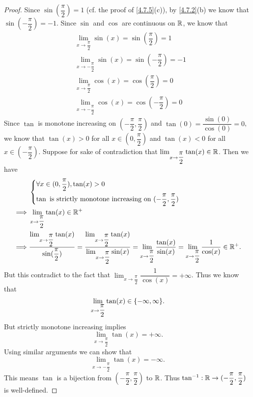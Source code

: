 \begin{proof}
  Since \(\sin(\dfrac{\pi}{2}) = 1\) (cf. the proof of \cref{4.7.5}(c)), by \cref{4.7.2}(b) we know that \(\sin(-\dfrac{\pi}{2}) = -1\).
  Since \(\sin\) and \(\cos\) are continuous on \(\mathbb{R}\), we know that
  \begin{align*}
     & \lim_{x \to \dfrac{\pi}{2}} \sin(x) = \sin(\dfrac{\pi}{2}) = 1    \\
     & \lim_{x \to -\dfrac{\pi}{2}} \sin(x) = \sin(-\dfrac{\pi}{2}) = -1 \\
     & \lim_{x \to \dfrac{\pi}{2}} \cos(x) = \cos(\dfrac{\pi}{2}) = 0    \\
     & \lim_{x \to -\dfrac{\pi}{2}} \cos(x) = \cos(-\dfrac{\pi}{2}) = 0
  \end{align*}
  Since \(\tan\) is monotone increasing on \((-\dfrac{\pi}{2}, \dfrac{\pi}{2})\) and \(\tan(0) = \dfrac{\sin(0)}{\cos(0)} = 0\), we know that \(\tan(x) > 0\) for all \(x \in (0, \dfrac{\pi}{2})\) and \(\tan(x) < 0\) for all \(x \in (-\dfrac{\pi}{2})\).
  Suppose for sake of contradiction that \(\lim_{x \to \dfrac{\pi}{2}} \tan(x) \in \mathbb{R}\).
  Then we have
  \begin{align*}
             & \begin{dcases}
                 \forall x \in (0, \dfrac{\pi}{2}), \tan(x) > 0 \\
                 \tan \text{ is strictly monotone increasing on } (-\dfrac{\pi}{2}, \dfrac{\pi}{2})
               \end{dcases}                                                                                                                                                                                      \\
    \implies & \lim_{x \to \dfrac{\pi}{2}} \tan(x) \in \mathbb{R}^+                                                                                                                                                                                                                           \\
    \implies & \dfrac{\lim_{x \to \dfrac{\pi}{2}} \tan(x)}{\sin(\dfrac{\pi}{2})} = \dfrac{\lim_{x \to \dfrac{\pi}{2}} \tan(x)}{\lim_{x \to \dfrac{\pi}{2}} \sin(x)} = \lim_{x \to \dfrac{\pi}{2}} \dfrac{\tan(x)}{\sin(x)} = \lim_{x \to \dfrac{\pi}{2}} \dfrac{1}{\cos(x)} \in \mathbb{R}^+.
  \end{align*}
  But this contradict to the fact that \(\lim_{x \to \dfrac{\pi}{2}} \dfrac{1}{\cos(x)} = +\infty\).
  Thus we know that
  \[
    \lim_{x \to \dfrac{\pi}{2}} \tan(x) \in \set{-\infty, \infty}.
  \]
  But strictly monotone increasing implies
  \[
    \lim_{x \to \dfrac{\pi}{2}} \tan(x) = +\infty.
  \]
  Using similar arguments we can show that
  \[
    \lim_{x \to -\dfrac{\pi}{2}} \tan(x) = -\infty.
  \]
  This means \(\tan\) is a bijection from \((-\dfrac{\pi}{2}, \dfrac{\pi}{2})\) to \(\mathbb{R}\).
  Thus \(\tan^{-1} : \mathbb{R} \to (-\dfrac{\pi}{2}, \dfrac{\pi}{2})\) is well-defined.


\end{proof}
